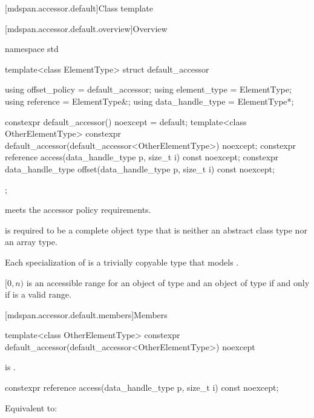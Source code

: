 [mdspan.accessor.default]{Class template }

[mdspan.accessor.default.overview]{Overview}

\begin{codeblock}
namespace std {
  template<class ElementType>
  struct default_accessor {
    using offset_policy = default_accessor;
    using element_type = ElementType;
    using reference = ElementType&;
    using data_handle_type = ElementType*;

    constexpr default_accessor() noexcept = default;
    template<class OtherElementType>
      constexpr default_accessor(default_accessor<OtherElementType>) noexcept;
    constexpr reference access(data_handle_type p, size_t i) const noexcept;
    constexpr data_handle_type offset(data_handle_type p, size_t i) const noexcept;
  };
}
\end{codeblock}

\pnum
{} meets the accessor policy requirements.

\pnum
{} is required to be a complete object type
that is neither an abstract class type nor an array type.

\pnum
Each specialization of  is
a trivially copyable type that models .

\pnum
$[0, n)$ is an accessible range for
an object  of type  and
an object of type 
if and only if  is a valid range.

[mdspan.accessor.default.members]{Members}

%
\begin{itemdecl}
template<class OtherElementType>
  constexpr default_accessor(default_accessor<OtherElementType>) noexcept {}
\end{itemdecl}

\begin{itemdescr}
\pnum
\constraints
{}
is .
\end{itemdescr}

%
\begin{itemdecl}
constexpr reference access(data_handle_type p, size_t i) const noexcept;
\end{itemdecl}

\begin{itemdescr}
\pnum
\effects
Equivalent to: 
\end{itemdescr}

